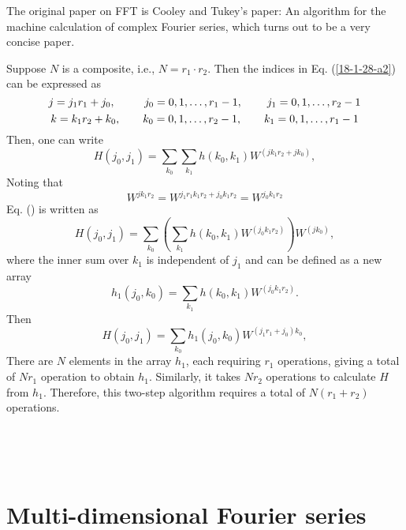 \documentclass{article}
\begin{document}
The original paper on FFT is Cooley and Tukey's paper: An algorithm for the
machine calculation of complex Fourier series, which turns out to be a very
concise paper.

Suppose $N$ is a composite, i.e., $N = r_1 \cdot r_2$. Then the indices in Eq.
(\ref{18-1-28-a2}) can be expressed as
\begin{equation}
  j = j_1 r_1 + j_0, \hspace{2.6em} j_0 = 0, 1, \ldots, r_1 - 1,
  \hspace{2.2em} j_1 = 0, 1, \ldots, r_2 - 1
\end{equation}
\begin{equation}
  k = k_1 r_2 + k_0, \hspace{2.0em} k_0 = 0, 1, \ldots, r_2 - 1,
  \hspace{2.0em} k_1 = 0, 1, \ldots, r_1 - 1
\end{equation}
Then, one can write
\begin{equation}
  H (j_0, j_1) = \sum_{k_0} \sum_{k_1} h (k_0, k_1) W^{(j k_1 r_2 + j k_0)},
\end{equation}
Noting that
\begin{equation}
  W^{j k_1 r_2} = W^{j_1 r_1 k_1 r_2 + j_0 k_1 r_2} = W^{j_0 k_1 r_2}
\end{equation}
Eq. () is written as
\begin{equation}
  H (j_0, j_1) = \sum_{k_0} \left( \sum_{k_1} h (k_0, k_1) W^{(j_0 k_1 r_2)}
  \right) W^{(j k_0)},
\end{equation}
where the inner sum over $k_1$ is independent of $j_1$ and can be defined as a
new array
\begin{equation}
  h_1 (j_0, k_0) = \sum_{k_1} h (k_0, k_1) W^{(j_0 k_1 r_2)} .
\end{equation}
Then
\begin{equation}
  H (j_0, j_1) = \sum_{k_0} h_1 (j_0, k_0) W^{(j_1 r_1 + j_0) k_0},
\end{equation}
There are $N$ elements in the array $h_1$, each requiring $r_1$ operations,
giving a total of $N r_1$ operation to obtain $h_1$. Similarly, it takes $N
r_2$ operations to calculate $H$ from $h_1$. Therefore, this two-step
algorithm requires a total of $N (r_1 + r_2)$ operations.

\

\

\section{Multi-dimensional Fourier series}
\end{document}
